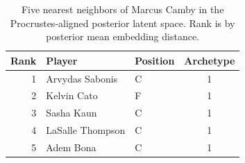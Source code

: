 \begin{table}[htbp]
  \centering\small
  \begin{tabular}{rllc}
    \toprule
    Rank & Player & Position & Archetype \\
    \midrule
    1 & Arvydas Sabonis & C & 1 \\
    2 & Kelvin Cato & F & 1 \\
    3 & Sasha Kaun & C & 1 \\
    4 & LaSalle Thompson & C & 1 \\
    5 & Adem Bona & C & 1 \\
    \bottomrule
  \end{tabular}
  \caption{Five nearest neighbors of Marcus Camby in the Procrustes-aligned posterior latent space. Rank is by posterior mean embedding distance.}
  \label{tab:Marcus_Camby_neighbors}
\end{table}

